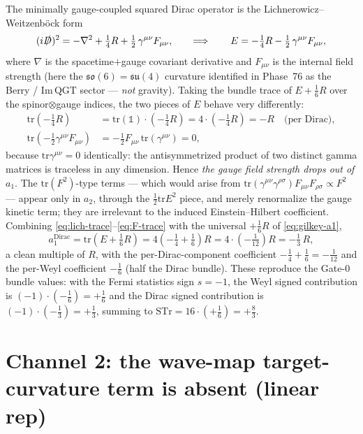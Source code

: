 \documentclass[11pt]{article}
\newcommand{\STr}{\mathrm{STr}}
\newcommand{\tr}{\mathrm{tr}}
\begin{document}
The minimally gauge-coupled squared Dirac operator is the Lichnerowicz--Weitzenb\"ock form
\begin{equation}\label{eq:lich-gauge}
(i\slashed{D})^2=-\nabla^2+\tfrac14 R+\tfrac12\,\gamma^{\mu\nu}F_{\mu\nu},
\qquad\Longrightarrow\qquad
E=-\tfrac14 R-\tfrac12\,\gamma^{\mu\nu}F_{\mu\nu},
\end{equation}
where $\nabla$ is the spacetime$+$gauge covariant derivative and $F_{\mu\nu}$ is the internal
field strength (here the $\mathfrak{so}(6)=\mathfrak{su}(4)$ curvature identified in
Phase~76 as the Berry / $\mathrm{Im}\,\mathrm{QGT}$ sector --- \emph{not} gravity).
Taking the bundle trace of $E+\tfrac16 R$ over the spinor$\otimes$gauge indices, the two
pieces of $E$ behave very differently:
\begin{align}
\tr\!\left(-\tfrac14 R\right)&=\tr(\mathbb{1})\cdot\left(-\tfrac14 R\right)=4\cdot\left(-\tfrac14 R\right)=-R\quad\text{(per Dirac)},\label{eq:lich-trace}\\
\tr\!\left(-\tfrac12\gamma^{\mu\nu}F_{\mu\nu}\right)&=-\tfrac12 F_{\mu\nu}\,\tr(\gamma^{\mu\nu})=0,\label{eq:F-trace}
\end{align}
because $\tr\gamma^{\mu\nu}=0$ identically: the antisymmetrized product of two distinct
gamma matrices is traceless in any dimension. Hence \emph{the gauge field strength drops out
of $a_1$}. The $\tr(F^2)$-type terms --- which would arise from $\tr(\gamma^{\mu\nu}
\gamma^{\rho\sigma})F_{\mu\nu}F_{\rho\sigma}\propto F^2$ --- appear only in $a_2$, through the
$\tfrac12\tr E^2$ piece, and merely renormalize the gauge kinetic term; they are irrelevant
to the induced Einstein--Hilbert coefficient. Combining \eqref{eq:lich-trace}--\eqref{eq:F-trace}
with the universal $+\tfrac16 R$ of \eqref{eq:gilkey-a1},
\begin{equation}\label{eq:a1-dirac}
a_1^{\text{Dirac}}=\tr\!\left(E+\tfrac16 R\right)
=4\left(-\tfrac14+\tfrac16\right)R
=4\cdot\left(-\tfrac{1}{12}\right)R
=-\tfrac13\,R,
\end{equation}
a clean multiple of $R$, with the per-Dirac-component coefficient $-\tfrac14+\tfrac16=-\tfrac{1}{12}$
and the per-Weyl coefficient $-\tfrac16$ (half the Dirac bundle). These reproduce the Gate-0
bundle values: with the Fermi statistics sign $s=-1$, the Weyl signed contribution is
$(-1)\cdot(-\tfrac16)=+\tfrac16$ and the Dirac signed contribution is $(-1)\cdot(-\tfrac13)=+\tfrac13$,
summing to $\STr=16\cdot(+\tfrac16)=+\tfrac83$.

\section{Channel 2: the wave-map target-curvature term is absent (linear rep)}\label{sec:wavemap}
\end{document}
